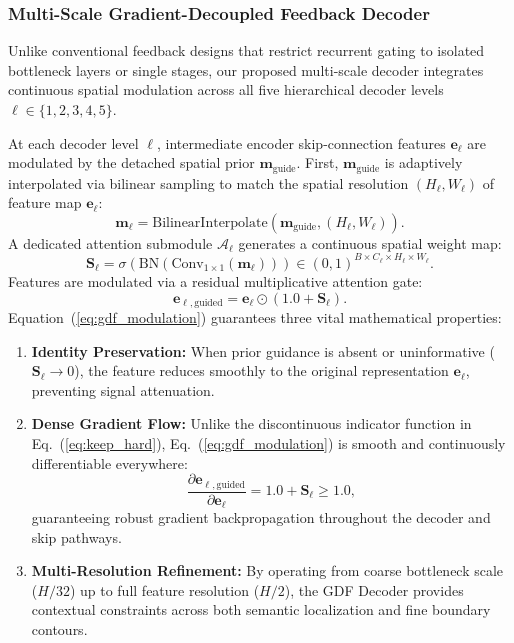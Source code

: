 \subsubsection{Multi-Scale Gradient-Decoupled Feedback Decoder}
Unlike conventional feedback designs that restrict recurrent gating to isolated bottleneck layers or single stages, our proposed multi-scale decoder integrates continuous spatial modulation across all five hierarchical decoder levels $\ell \in \{1, 2, 3, 4, 5\}$.

At each decoder level $\ell$, intermediate encoder skip-connection features $\mathbf{e}_\ell$ are modulated by the detached spatial prior $\mathbf{m}_{\text{guide}}$. First, $\mathbf{m}_{\text{guide}}$ is adaptively interpolated via bilinear sampling to match the spatial resolution $(H_\ell, W_\ell)$ of feature map $\mathbf{e}_\ell$:
\begin{equation}
  \mathbf{m}_\ell = \text{BilinearInterpolate}\left(\mathbf{m}_{\text{guide}}, (H_\ell, W_\ell)\right).
\end{equation}
A dedicated attention submodule $\mathcal{A}_\ell$ generates a continuous spatial weight map:
\begin{equation}
  \mathbf{S}_\ell = \sigma\left(\text{BN}\left(\text{Conv}_{1 \times 1}\left(\mathbf{m}_\ell\right)\right)\right) \in (0, 1)^{B \times C_\ell \times H_\ell \times W_\ell}.
\end{equation}
Features are modulated via a residual multiplicative attention gate:
\begin{equation}
  \label{eq:gdf_modulation}
  \mathbf{e}_{\ell, \text{guided}} = \mathbf{e}_\ell \odot \left(1.0 + \mathbf{S}_\ell\right).
\end{equation}
Equation~(\ref{eq:gdf_modulation}) guarantees three vital mathematical properties:
\begin{enumerate}
  \item \textbf{Identity Preservation:} When prior guidance is absent or uninformative ($\mathbf{S}_\ell \to 0$), the feature reduces smoothly to the original representation $\mathbf{e}_\ell$, preventing signal attenuation.
  \item \textbf{Dense Gradient Flow:} Unlike the discontinuous indicator function in Eq.~(\ref{eq:keep_hard}), Eq.~(\ref{eq:gdf_modulation}) is smooth and continuously differentiable everywhere:
  \begin{equation}
    \frac{\partial \mathbf{e}_{\ell, \text{guided}}}{\partial \mathbf{e}_\ell} = 1.0 + \mathbf{S}_\ell \ge 1.0,
  \end{equation}
  guaranteeing robust gradient backpropagation throughout the decoder and skip pathways.
  \item \textbf{Multi-Resolution Refinement:} By operating from coarse bottleneck scale ($H/32$) up to full feature resolution ($H/2$), the GDF Decoder provides contextual constraints across both semantic localization and fine boundary contours.
\end{enumerate}

